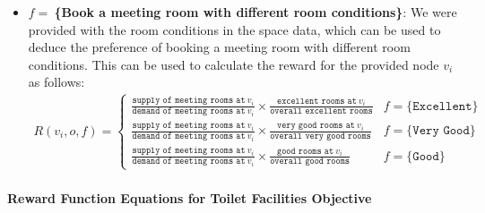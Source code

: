 \begin{itemize}
     \item \textbf{$f=\:$\{Book a meeting room with different room conditions\}}: We were provided with the room conditions in the space data, which can be used to deduce the preference of booking a meeting room with different room conditions. This can be used to calculate the reward for the provided node $v_i$ as follows:
     \begin{gather}
         R(v_i,o,f) = \begin{cases}\frac{\texttt{supply of meeting rooms at}\:v_i}{\texttt{demand of meeting rooms at}\:v_i} \times \frac{\texttt{excellent rooms at}\:v_i}{\texttt{overall excellent rooms}} & f=\{\texttt{Excellent}\} \\
         \frac{\texttt{supply of meeting rooms at}\:v_i}{\texttt{demand of meeting rooms at}\:v_i} \times \frac{\texttt{very good rooms at}\:v_i}{\texttt{overall very good rooms}} & f=\{\texttt{Very Good}\} \\
        \frac{\texttt{supply of meeting rooms at}\:v_i}{\texttt{demand of meeting rooms at}\:v_i} \times \frac{\texttt{good rooms at}\:v_i}{\texttt{overall good rooms}} & f=\{\texttt{Good}\}
        \end{cases}
     \end{gather}
\end{itemize}

\paragraph{Reward Function Equations for Toilet Facilities Objective}


